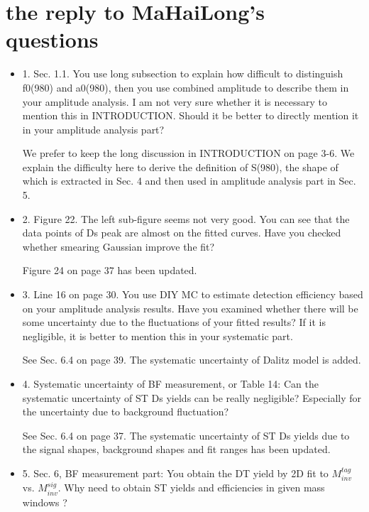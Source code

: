 \documentclass[a4paper]{article}
\begin{document}
\section{the reply to MaHaiLong's questions }
\begin{itemize}
    \item 1. Sec. 1.1.  You use long subsection to explain how difficult to distinguish f0(980) and a0(980), then you use combined amplitude to describe them in your amplitude analysis. 
        I am not very sure whether it is necessary to mention this in INTRODUCTION. 
        Should it be better to directly mention it in your amplitude analysis part?

        {\color{blue} 
            We prefer to keep the long discussion in INTRODUCTION on page 3-6.
            We explain the difficulty here to derive the definition of S(980), the shape of which is extracted in Sec. 4 and then used in amplitude analysis part in Sec. 5.
        }

    \item 2. Figure 22. The left sub-figure seems not very good. You can see that the data points of Ds peak are almost on the fitted curves.
        Have you checked whether smearing Gaussian improve the fit?

        {\color{blue}Figure 24 on page 37 has been updated.}


    \item 3. Line 16 on page 30.
        You use DIY MC to estimate detection efficiency based on your amplitude analysis results. 
        Have you examined whether there will be some uncertainty due to the fluctuations of your fitted results? If it is negligible, it is better to mention this in your systematic part.

        {\color{blue}See Sec. 6.4 on page 39.
            The systematic uncertainty of Dalitz model is added.
        }

    \item 4. Systematic uncertainty of BF measurement, or Table 14: 
        Can the systematic uncertainty of ST Ds yields can be really negligible? 
        Especially for the uncertainty due to background fluctuation?

        {\color{blue}See Sec. 6.4 on page 37. The systematic uncertainty of ST Ds yields due to the signal shapes, background shapes and fit ranges has been updated.}

    \item 5. Sec. 6, BF measurement part: You obtain the DT yield by 2D fit to $M_{inv}^{tag}$ vs. $M_{inv}^{sig}$.
          Why need to obtain ST yields and efficiencies in given mass windows ?
        

\end{itemize}
\end{document}
